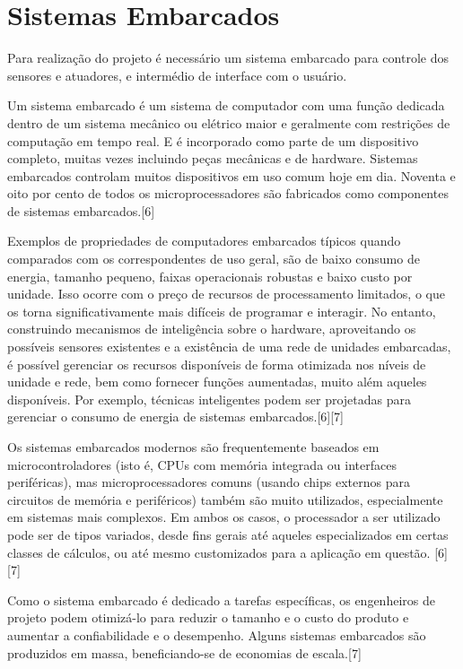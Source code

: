 \section{Sistemas Embarcados}

Para realização do projeto é necessário um sistema embarcado para controle dos sensores e atuadores, e intermédio de interface com o usuário.

Um sistema embarcado é um sistema de computador com uma função dedicada dentro de um sistema mecânico ou elétrico maior e geralmente com restrições de computação em tempo real. E é incorporado como parte de um dispositivo completo, muitas vezes incluindo peças mecânicas e de hardware. Sistemas embarcados controlam muitos dispositivos em uso comum hoje em dia. Noventa e oito por cento de todos os microprocessadores são fabricados como componentes de sistemas embarcados.[6]

Exemplos de propriedades de computadores embarcados típicos quando comparados com os correspondentes de uso geral, são de baixo consumo de energia, tamanho pequeno, faixas operacionais robustas e baixo custo por unidade. Isso ocorre com o preço de recursos de processamento limitados, o que os torna significativamente mais difíceis de programar e interagir. No entanto, construindo mecanismos de inteligência sobre o hardware, aproveitando os possíveis sensores existentes e a existência de uma rede de unidades embarcadas, é possível gerenciar os recursos disponíveis de forma otimizada nos níveis de unidade e rede, bem como fornecer funções aumentadas, muito além aqueles disponíveis. Por exemplo, técnicas inteligentes podem ser projetadas para gerenciar o consumo de energia de sistemas embarcados.[6][7]

Os sistemas embarcados modernos são frequentemente baseados em microcontroladores (isto é, CPUs com memória integrada ou interfaces periféricas), mas microprocessadores comuns (usando chips externos para circuitos de memória e periféricos) também são muito utilizados, especialmente em sistemas mais complexos. Em ambos os casos, o processador a ser utilizado  pode ser de tipos variados, desde fins gerais até aqueles especializados em certas classes de cálculos, ou até mesmo customizados para a aplicação em questão. [6][7]

Como o sistema embarcado é dedicado a tarefas específicas, os engenheiros de projeto podem otimizá-lo para reduzir o tamanho e o custo do produto e aumentar a confiabilidade e o desempenho. Alguns sistemas embarcados são produzidos em massa, beneficiando-se de economias de escala.[7]

